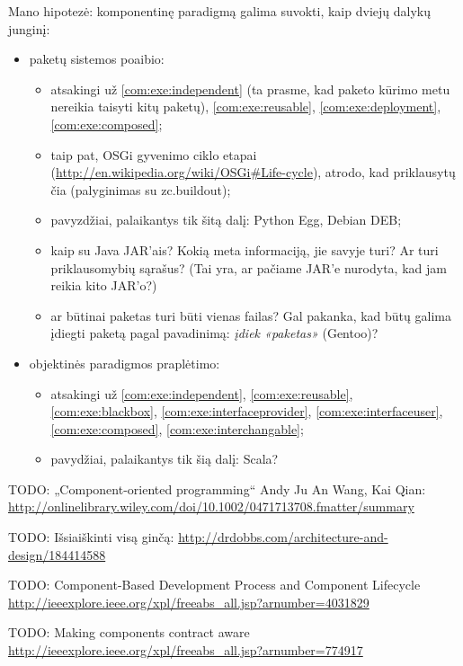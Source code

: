 Mano hipotezė: komponentinę paradigmą galima suvokti, kaip dviejų dalykų
junginį:
\begin{itemize}
  \item paketų sistemos poaibio:
    \begin{itemize}
      \item atsakingi už \ref{com:exe:independent} (ta prasme, kad paketo
        kūrimo metu nereikia taisyti kitų paketų), \ref{com:exe:reusable},
        \ref{com:exe:deployment}, \ref{com:exe:composed};
      \item taip pat, OSGi gyvenimo ciklo etapai
        (\url{http://en.wikipedia.org/wiki/OSGi#Life-cycle}), atrodo,
        kad priklausytų čia (palyginimas su zc.buildout);
      \item pavyzdžiai, palaikantys tik šitą dalį: Python Egg, Debian DEB;
      \item kaip su Java JAR'ais? Kokią meta informaciją, jie savyje turi?
        Ar turi priklausomybių sąrašus? (Tai yra, ar pačiame JAR'e nurodyta,
        kad jam reikia kito JAR'o?)
      \item ar būtinai paketas turi būti vienas failas? Gal pakanka, kad
        būtų galima įdiegti paketą pagal pavadinimą:
        \emph{įdiek «paketas»} (Gentoo)?
    \end{itemize}
  \item objektinės paradigmos praplėtimo:
    \begin{itemize}
      \item atsakingi už \ref{com:exe:independent},
        \ref{com:exe:reusable}, \ref{com:exe:blackbox},
        \ref{com:exe:interfaceprovider}, \ref{com:exe:interfaceuser},
        \ref{com:exe:composed}, \ref{com:exe:interchangable};
      \item pavydžiai, palaikantys tik šią dalį: Scala?
    \end{itemize}
\end{itemize}

TODO: „Component-oriented programming“ Andy Ju An Wang, Kai Qian:
\url{http://onlinelibrary.wiley.com/doi/10.1002/0471713708.fmatter/summary}

TODO: Išsiaiškinti visą ginčą:
\url{http://drdobbs.com/architecture-and-design/184414588}
\cite{what-to-compose}

TODO: Component-Based Development Process and Component Lifecycle
\url{http://ieeexplore.ieee.org/xpl/freeabs_all.jsp?arnumber=4031829}

TODO: Making components contract aware
\url{http://ieeexplore.ieee.org/xpl/freeabs_all.jsp?arnumber=774917}

